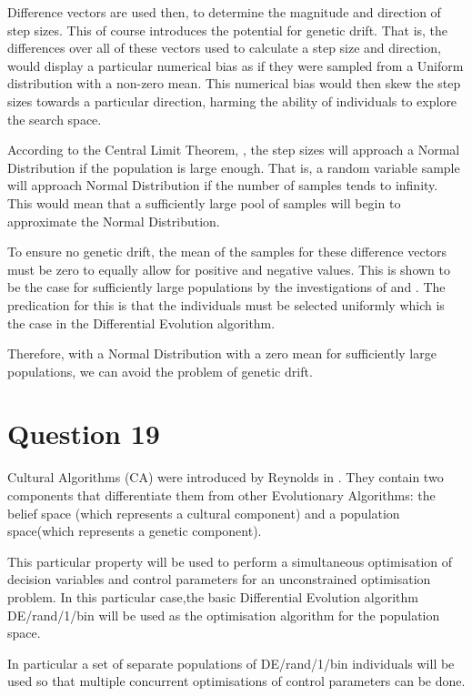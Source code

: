 \documentclass[12pt]{article}
\begin{document}
Difference vectors are used then, to determine the magnitude and direction of step sizes. This of course introduces the potential for genetic drift. That is, the differences over all of these vectors used to calculate a step size and direction, would display a particular numerical bias as if they were sampled from a Uniform distribution with a non-zero mean. This numerical bias would then skew the step sizes towards a particular direction, harming the ability of individuals to explore the search space.

According to the Central Limit Theorem, \cite{davidson_2002}, the step sizes will approach a Normal Distribution if the population is large enough. That is, a random variable sample will approach Normal Distribution if the number of samples tends to infinity. This would mean that a sufficiently large pool of samples will begin to approximate the Normal Distribution. 

To ensure no genetic drift, the mean of the samples for these difference vectors must be zero to equally allow for positive and negative values. This is shown to be the case for sufficiently large populations by the investigations of \cite{price_1997} and \cite{cruz_willigenburg_straten_2003}. The predication for this is that the individuals must be selected uniformly which is the case in the Differential Evolution algorithm.

Therefore, with a Normal Distribution with a zero mean for sufficiently large populations, we can avoid the problem of genetic drift. 
\section{Question 19}
Cultural Algorithms (CA) were introduced by Reynolds in \cite{reynolds:1994:ica}. They contain two components that differentiate them from other Evolutionary Algorithms: the belief space (which represents a cultural component) and a population space(which represents a genetic component).

This particular property will be used to perform a simultaneous optimisation of decision variables and control parameters for an unconstrained optimisation problem. In this particular case,the basic Differential Evolution algorithm DE/rand/1/bin will be used as the optimisation algorithm for the population space.

In particular a set of separate populations of DE/rand/1/bin individuals will be used so that multiple concurrent optimisations of control parameters can be done.
\end{document}
